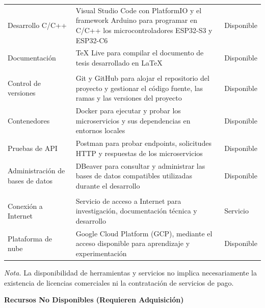 \documentclass[12pt,a4paper]{article}
\begin{document}
\begin{longtable}{@{} p{} p{} p{} @{}}
	Desarrollo C/C++ &
	Visual Studio Code con PlatformIO y el framework Arduino para programar en C/C++ los microcontroladores ESP32-S3 y ESP32-C6 &
	Disponible \\
	
	Documentación &
	TeX Live para compilar el documento de tesis desarrollado en LaTeX &
	Disponible \\
	\addlinespace
	
	\multicolumn{3}{l}{\textbf{Herramientas de desarrollo y pruebas}} \\
	\midrule
	Control de versiones &
	Git y GitHub para alojar el repositorio del proyecto y gestionar el código fuente, las ramas y las versiones del proyecto &
	Disponible \\
	
	Contenedores &
	Docker para ejecutar y probar los microservicios y sus dependencias en entornos locales &
	Disponible \\
	
	Pruebas de API &
	Postman para probar endpoints, solicitudes HTTP y respuestas de los microservicios &
	Disponible \\
	
	Administración de bases de datos &
	DBeaver para consultar y administrar las bases de datos compatibles utilizadas durante el desarrollo &
	Disponible \\
	\addlinespace
	
	\multicolumn{3}{l}{\textbf{Conectividad y servicios digitales}} \\
	\midrule
	Conexión a Internet &
	Servicio de acceso a Internet para investigación, documentación técnica y desarrollo &
	Servicio \\
	
	Plataforma de nube &
	Google Cloud Platform (GCP), mediante el acceso disponible para aprendizaje y experimentación &
	Disponible \\
	
\end{longtable}
\endgroup

\vspace{0.2cm}

\noindent\parbox{\textwidth}{
	\setlength{\parindent}{0pt}
	\small
	\textit{Nota.} La disponibilidad de herramientas y servicios no implica necesariamente la existencia de licencias comerciales ni la contratación de servicios de pago.
}

\vspace{0.3cm}
\noindent\textbf{Recursos No Disponibles (Requieren Adquisición)}
\end{document}
